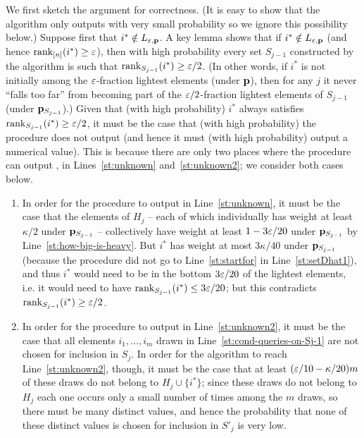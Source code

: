 We first sketch the argument for correctness.
(It is easy to show that the algorithm only outputs \fail with very small
probability so we ignore this possibility below.)
Suppose first that $i^\ast \notin L_{\varepsilon,\mathbf{p}}$.  A key lemma shows that if
$i^\ast \notin L_{\varepsilon,\mathbf{p}}$ (and hence
$\operatorname{rank}_{[n]}(i^\ast) \geq \varepsilon$), then with high
probability every set $S_{j-1}$ constructed by the algorithm
is such that $\operatorname{rank}_{S_{j-1}}(i^\ast) \geq \varepsilon/2$.  (In other words,
if $i^\ast$ is not initially among the $\varepsilon$-fraction 
lightest elements (under $\mathbf{p}$), then for any $j$ it never ``falls too far''
from becoming part of the $\varepsilon/2$-fraction 
lightest elements of $S_{j-1}$ (under $\mathbf{p}_{S_{j-1}}$).)  Given that
(with high probability) $i^\ast$ always satisfies $\operatorname{rank}_{S_{j-1}}(i^\ast) \geq \varepsilon/2$, 
it must be the case that (with high probability) the procedure does not output \unknown
(and hence it must (with high probability) output a numerical value).
This is because there are only two places where the procedure can
output \unknown, in Lines~\ref{st:unknown} and~\ref{st:unknown2};
we consider both cases below.

\begin{enumerate}

\item
In order for the procedure to output \unknown in Line~\ref{st:unknown},
it must be the case that the elements of $H_{j}$ -- each of
which individually has weight at least $\kappa/2$ under $\mathbf{p}_{S_{j-1}}$ --
collectively have weight at least $1-{3\varepsilon/20}$ under $\mathbf{p}_{S_{j-1}}$
by Line~\ref{st:how-big-is-heavy}.
But $i^\ast$ has weight at most {$3\kappa/40$} under
$\mathbf{p}_{S_{j-1}}$ (because the procedure did not go to Line~\ref{st:startfor} in
Line~\ref{st:setDhat1}),
and thus $i^\ast$ would need to be in the bottom {$3\varepsilon/20$} of
the lightest elements, i.e. it would need to have $\rank_{S_{j-1}}(i^\ast)
\leq {3\eps/20}$; but this contradicts
$\operatorname{rank}_{S_{j-1}}(i^\ast) \geq \varepsilon/2$.

\item
In order for the procedure to output \unknown in Line~\ref{st:unknown2},
it must be the case that all elements $i_1,\dots,i_m$ drawn in
Line~\ref{st:cond-queries-on-Sj-1} are not chosen for inclusion in $S_j.$
In order for the algorithm to reach Line~\ref{st:unknown2}, though,
it must be the case that at least $(\varepsilon/10 - \kappa/20)m$
of these draws do not belong to $H_{j} \cup \{i^\ast\}$;
since these draws do not belong to $H_{j}$
each one occurs only a small number
of times among the $m$ draws, so there must be many distinct values,
and hence the probability that none of these distinct values is chosen
for inclusion in $S'_j$ is very low.

\end{enumerate}

